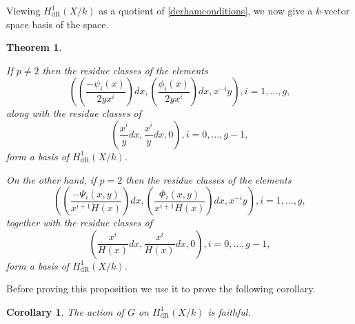 \documentclass[draft, 11pt]{article} %
\theoremstyle{plain}
\newtheorem{thm}[defn]{Theorem}
\newtheorem{cor}[defn]{Corollary}
\theoremstyle{remark}
\newcommand{\derhamhone}{H_{\text {dR}}^1(X/k)}
\begin{document}
Viewing $\derhamhone$ as a quotient of \eqref{derhamconditions}, we now give a $k$-vector space basis of the space.
\begin{thm}\label{basis}

If $p \neq 2$ then the residue classes of the elements 
\begin{equation}\label{one}
 \left( \left( \frac{-\psi_i(x)}{2yx^i}\right) dx, \left(\frac{\phi_i(x)}{2yx^i}\right) dx, x^{-i}y\right), i=1, \ldots ,g,
\end{equation}
along with the residue classes of 
\begin{equation}\label{two}
 \left( \frac{x^{i}}{y} dx , \frac{x^{i}}{y} dx, 0 \right), i = 0,\ldots ,g-1,
\end{equation}
form a basis of $\derhamhone$.

On the other hand, if $p=2$ then the residue classes of the elements 
\begin{equation}\label{three}
\left( \left(\frac{-\Psi_i(x,y)}{x^{i+1}H(x)}\right) dx, \left( \frac{\Phi_i(x,y)}{x^{i+1}H(x)} \right) dx, x^{-i}y \right), i =1, \ldots , g, 
\end{equation}
together with the residue classes of 
\begin{equation}\label{four}
\left( \frac{x^{i}}{H(x)} dx, \frac{x^{i}}{H(x)} dx, 0 \right), i=0, \ldots, g-1,
\end{equation}
form a basis of $\derhamhone$.
\end{thm}

Before proving this proposition we use it to prove the following corollary.

\begin{cor}
The action of $G$ on $\derhamhone$ is faithful.
\end{cor}
\end{document}

